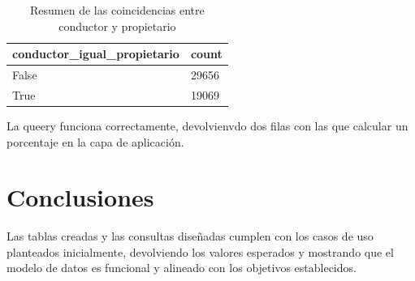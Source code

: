 \documentclass[]{article}
\begin{document}
\begin{itemize}
\begin{table}[H]
\begin{longtable}{l l}
    \hline
    \textbf{conductor\_igual\_propietario} & \textbf{count} \\ \hline
    \endhead
    
    False & 29656 \\ \hline
    True & 19069 \\ \hline
    
\end{longtable}
\caption{Resumen de las coincidencias entre conductor y propietario}
\end{table}

La queery funciona correctamente, devolvienvdo dos filas con las que calcular un porcentaje en la capa de aplicación.

\end{itemize}

\newpage
\section{Conclusiones}

Las tablas creadas y las consultas diseñadas cumplen con los casos de uso planteados inicialmente, devolviendo los valores esperados y mostrando que el modelo de datos es funcional y alineado con los objetivos establecidos.

\label{sec:conclusion}
\end{document}

